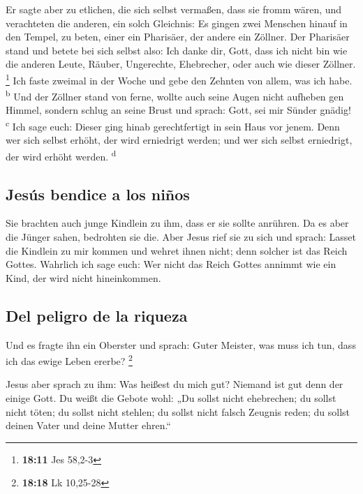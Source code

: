  Er sagte aber zu etlichen, die sich selbst vermaßen, dass
sie fromm wären, und verachteten die anderen, ein solch Gleichnis:
 Es gingen zwei Menschen hinauf in den Tempel, zu beten,
einer ein Pharisäer, der andere ein Zöllner.  Der
Pharisäer stand und betete bei sich selbst also: Ich danke dir, Gott,
dass ich nicht bin wie die anderen Leute, Räuber, Ungerechte,
Ehebrecher, oder auch wie dieser Zöllner. \footnote{\textbf{18:11} Jes
  58,2-3}  Ich faste zweimal in der Woche und gebe den
Zehnten von allem, was ich habe. \textsuperscript{b}  Und
der Zöllner stand von ferne, wollte auch seine Augen nicht aufheben gen
Himmel, sondern schlug an seine Brust und sprach: Gott, sei mir Sünder
gnädig! \textsuperscript{c}  Ich sage euch: Dieser ging
hinab gerechtfertigt in sein Haus vor jenem. Denn wer sich selbst
erhöht, der wird erniedrigt werden; und wer sich selbst erniedrigt, der
wird erhöht werden. \textsuperscript{d}

\hypertarget{jesuxfas-bendice-a-los-niuxf1os}{%
\subsection{Jesús bendice a los
niños}\label{jesuxfas-bendice-a-los-niuxf1os}}

 Sie brachten auch junge Kindlein zu ihm, dass er sie
sollte anrühren. Da es aber die Jünger sahen, bedrohten sie die.
 Aber Jesus rief sie zu sich und sprach: Lasset die
Kindlein zu mir kommen und wehret ihnen nicht; denn solcher ist das
Reich Gottes.  Wahrlich ich sage euch: Wer nicht das
Reich Gottes annimmt wie ein Kind, der wird nicht hineinkommen.

\hypertarget{del-peligro-de-la-riqueza}{%
\subsection{Del peligro de la riqueza}\label{del-peligro-de-la-riqueza}}

 Und es fragte ihn ein Oberster und sprach: Guter
Meister, was muss ich tun, dass ich das ewige Leben ererbe? \footnote{\textbf{18:18}
  Lk 10,25-28}

 Jesus aber sprach zu ihm: Was heißest du mich gut?
Niemand ist gut denn der einige Gott.  Du weißt die
Gebote wohl: „Du sollst nicht ehebrechen; du sollst nicht töten; du
sollst nicht stehlen; du sollst nicht falsch Zeugnis reden; du sollst
deinen Vater und deine Mutter ehren.``

